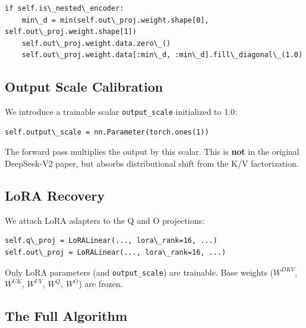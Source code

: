 \begin{lstlisting}
if self.is\_nested\_encoder:
    min\_d = min(self.out\_proj.weight.shape[0], self.out\_proj.weight.shape[1])
    self.out\_proj.weight.data.zero\_()
    self.out\_proj.weight.data[:min\_d, :min\_d].fill\_diagonal\_(1.0)
\end{lstlisting}

\subsection{Output Scale Calibration}

We introduce a trainable scalar \texttt{output\_scale} initialized to 1.0:

\begin{lstlisting}
self.output\_scale = nn.Parameter(torch.ones(1))
\end{lstlisting}

The forward pass multiplies the output by this scalar. This is \textbf{not} in 
the original DeepSeek-V2 paper, but absorbs distributional shift from the 
K/V factorization.

\subsection{LoRA Recovery}

We attach LoRA adapters to the Q and O projections:

\begin{lstlisting}
self.q\_proj = LoRALinear(..., lora\_rank=16, ...)
self.out\_proj = LoRALinear(..., lora\_rank=16, ...)
\end{lstlisting}

Only LoRA parameters (and \texttt{output\_scale}) are trainable. Base weights 
($W^{DKV}$, $W^{UK}$, $W^{UV}$, $W^Q$, $W^O$) are frozen.

\subsection{The Full Algorithm}


